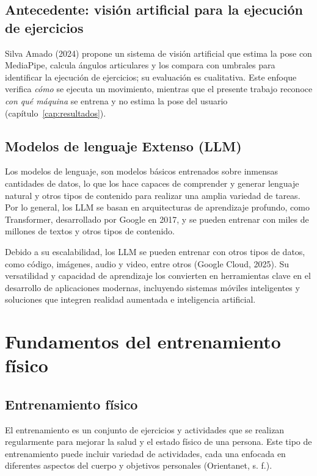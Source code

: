 \subsection{Antecedente: visión artificial para la ejecución de ejercicios}

Silva Amado (2024) propone un sistema de visión artificial que estima la pose
con MediaPipe, calcula ángulos articulares y los compara con umbrales para
identificar la ejecución de ejercicios; su evaluación es cualitativa. Este
enfoque verifica \emph{cómo} se ejecuta un movimiento, mientras que el presente
trabajo reconoce \emph{con qué máquina} se entrena y no estima la pose del
usuario (capítulo~\ref{cap:resultados}).

\subsection{Modelos de lenguaje Extenso (LLM)}

Los modelos de lenguaje, son modelos básicos entrenados sobre inmensas
cantidades de datos, lo que los hace capaces de comprender y generar lenguaje
natural y otros tipos de contenido para realizar una amplia variedad de
tareas. Por lo general, los LLM se basan en arquitecturas de aprendizaje
profundo, como Transformer, desarrollado por Google en 2017, y se pueden
entrenar con miles de millones de textos y otros tipos de contenido.

Debido a su escalabilidad, los LLM se pueden entrenar con otros tipos de datos,
como código, imágenes, audio y video, entre otros (Google Cloud, 2025). Su
versatilidad y capacidad de aprendizaje los convierten en herramientas clave en
el desarrollo de aplicaciones modernas, incluyendo sistemas móviles
inteligentes y soluciones que integren realidad aumentada e inteligencia
artificial.

\section{Fundamentos del entrenamiento físico}
\label{sec:entrenamiento}

\subsection{Entrenamiento físico}

El entrenamiento es un conjunto de ejercicios y actividades que se realizan
regularmente para mejorar la salud y el estado físico de una persona. Este tipo
de entrenamiento puede incluir variedad de actividades, cada una enfocada en
diferentes aspectos del cuerpo y objetivos personales (Orientanet, s. f.).

